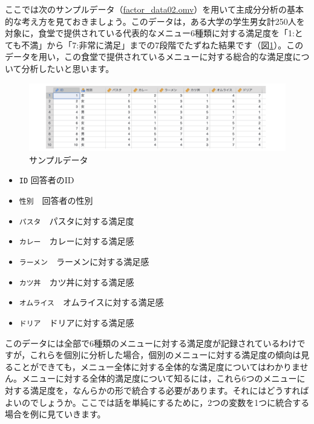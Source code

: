 \documentclass[
  12pt,
  a5jpaper,
  lualatex, ja=standard]{bxjsbook}
\providecommand{\tightlist}{%
  \setlength{\itemsep}{0pt}\setlength{\parskip}{0pt}}
\newenvironment{jmvvar}{%
	\begin{center}%
	\begin{tcolorbox}[%
		title=変数一覧,
		colframe=daidai,
		colbacktitle=daidai!30!white,
		coltitle=daidai!10!black,
		colback=daidai!2!white,
		breakable,
		width=.9\textwidth
		]\small\addtolength{\leftmargini}{-3\labelsep}%
	}%
	{\end{tcolorbox}\end{center}}
\begin{document}
ここでは次のサンプルデータ（\href{https://github.com/sbtseiji/jmv_compguide/raw/main/data/omv/factor_data02.omv}{factor\_data02.omv}）を用いて主成分分析の基本的な考え方を見ておきましょう。このデータは，ある大学の学生男女計250人を対象に，食堂で提供されている代表的なメニュー6種類に対する満足度を「1:とても不満」から「7:非常に満足」までの7段階でたずねた結果です（図\ref{fig:factor-data02}）。このデータを用い，この食堂で提供されているメニューに対する総合的な満足度について分析したいと思います。

\begin{figure}[!ht]

{\centering \includegraphics[width=1\linewidth]{images/factor/data02} 

}

\caption{サンプルデータ}\label{fig:factor-data02}
\end{figure}

\begin{jmvvar}

\begin{itemize}
\tightlist
\item
  \texttt{ID} 回答者のID
\item
  \texttt{性別}　回答者の性別
\item
  \texttt{パスタ}　パスタに対する満足度
\item
  \texttt{カレー}　カレーに対する満足感
\item
  \texttt{ラーメン}　ラーメンに対する満足感
\item
  \texttt{カツ丼}　カツ丼に対する満足感
\item
  \texttt{オムライス}　オムライスに対する満足感
\item
  \texttt{ドリア}　ドリアに対する満足感
\end{itemize}

\end{jmvvar}

このデータには全部で6種類のメニューに対する満足度が記録されているわけですが，これらを個別に分析した場合，個別のメニューに対する満足度の傾向は見ることができても，メニュー全体に対する全体的な満足度についてはわかりません。メニューに対する全体的満足度について知るには，これら6つのメニューに対する満足度を，なんらかの形で統合する必要があります。それにはどうすればよいのでしょうか。ここでは話を単純にするために，2つの変数を1つに統合する場合を例に見ていきます。
\end{document}
